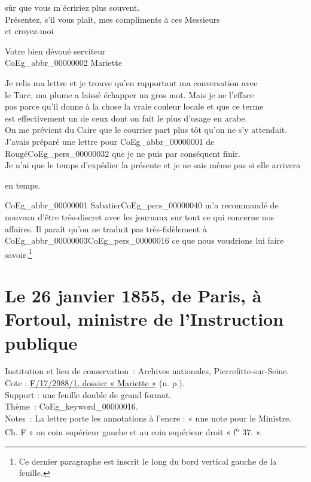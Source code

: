 \documentclass{book}
\begin{document}
sûr que vous m’écririez plus souvent.\\
\indent Présentez, s’il vous plaît, mes compliments à ces Messieurs\\
et croyez-moi
\begin{center}\hspace{5cm} Votre bien dévoué serviteur\\
\hspace{5cm} \gls{CoEg_abbr_00000002} Mariette\end{center}
\indent Je relis ma lettre et je trouve qu’en rapportant ma conversation avec\\
le Turc, ma plume a laissé échapper un gros mot. Mais je ne l’efface\\
pas parce qu’il donne à la chose la vraie couleur locale et que ce terme\\
est effectivement un de ceux dont on fait le plus d’usage en arabe.\\
\indent On me prévient du Caire que le courrier part plus tôt qu’on ne s’y attendait.\\
J’avais préparé une lettre pour \gls{CoEg_abbr_00000001} de Rougé\gls{CoEg_pers_00000032} que je ne puis par conséquent finir.\\
Je n’ai que le temps d’expédier la présente et je ne sais même pas si elle arrivera
\begin{flushright}en temps.\end{flushright}
{\footnotesize \indent \gls{CoEg_abbr_00000001} Sabatier\gls{CoEg_pers_00000040} m’a recommandé de nouveau d’être très-discret avec les journaux sur tout ce qui concerne nos\\
affaires. Il paraît qu’on ne traduit pas très-fidèlement à \gls{CoEg_abbr_00000003}\gls{CoEg_pers_00000016} ce que nous voudrions lui faire savoir.}\footnote{Ce dernier paragraphe est inscrit le long du bord vertical gauche de la feuille.}

\hypertarget{CoEg_Mariette_1855-01-26}{}

\section*{Le 26 janvier 1855, de Paris, à Fortoul, ministre de l’Instruction publique}
 \label{labCoEg_Mariette_1855-01-26}
{\footnotesize
\noindent Institution et lieu de conservation~: Archives nationales, Pierrefitte-sur-Seine.\\
Cote : \hyperlink{CoEg_Mariette_ms_002}{F/17/2988/1, dossier « Mariette »} (n. p.).\\
Support : une feuille double de grand format.\\
Thème~: \gls{CoEg_keyword_00000016}.\\
Notes~: La lettre porte les annotations à l’encre : « une note pour le Ministre. Ch. F » au coin supérieur gauche et au coin supérieur droit « f\textsuperscript{o} 37. ».}
\end{document}

